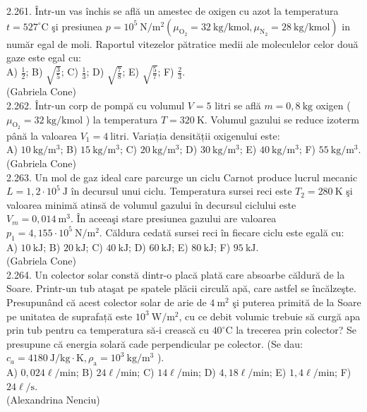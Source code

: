 \documentclass[10pt]{article}
\begin{document}
2.261. Într-un vas închis se află un amestec de oxigen cu azot la temperatura $t=527^{\circ} \mathrm{C}$ şi presiunea $p=10^{5} \mathrm{~N} / \mathrm{m}^{2}\left(\mu_{\mathrm{O}_{2}}=32 \mathrm{~kg} / \mathrm{kmol}, \mu_{\mathrm{N}_{2}}=28 \mathrm{~kg} / \mathrm{kmol}\right)$ in număr egal de moli. Raportul vitezelor pătratice medii ale moleculelor celor două gaze este egal cu:\\ A) $\frac{1}{2}$; B) $\sqrt{\frac{3}{5}}$; C) $\frac{1}{3}$; D) $\sqrt{\frac{7}{8}}$; E) $\sqrt{\frac{5}{7}}$; F) $\frac{2}{3}$.\\ (Gabriela Cone)\\

2.262. Într-un corp de pompă cu volumul $V=5$ litri se află $m=0,8 \mathrm{~kg}$ oxigen ( $\mu_{\mathrm{O}_{2}}=32 \mathrm{~kg} / \mathrm{kmol}$ ) la temperatura $T=320 \mathrm{~K}$. Volumul gazului se reduce izoterm până la valoarea $V_{1}=4 \mathrm{~litri}$. Variația densității oxigenului este:\\ A) $10 \mathrm{~kg} / \mathrm{m}^{3}$; B) $15 \mathrm{~kg} / \mathrm{m}^{3}$; C) $20 \mathrm{~kg} / \mathrm{m}^{3}$; D) $30 \mathrm{~kg} / \mathrm{m}^{3}$; E) $40 \mathrm{~kg} / \mathrm{m}^{3}$; F) $55 \mathrm{~kg} / \mathrm{m}^{3}$.\\ (Gabriela Cone)\\

2.263. Un mol de gaz ideal care parcurge un ciclu Carnot produce lucrul mecanic $L=1,2 \cdot 10^{5} \mathrm{~J}$ în decursul unui ciclu. Temperatura sursei reci este $T_{2}=280 \mathrm{~K}$ şi valoarea minimă atinsă de volumul gazului în decursul ciclului este $V_{m}=0,014 \mathrm{~m}^{3}$. În aceeaşi stare presiunea gazului are valoarea $p_{1}=4,155 \cdot 10^{5} \mathrm{~N} / \mathrm{m}^{2}$. Căldura cedată sursei reci în fiecare ciclu este egală cu:\\ A) $10 \mathrm{~kJ}$; B) $20 \mathrm{~kJ}$; C) $40 \mathrm{~kJ}$; D) $60 \mathrm{~kJ}$; E) $80 \mathrm{~kJ}$; F) $95 \mathrm{~kJ}$.\\ (Gabriela Cone)\\

2.264. Un colector solar constă dintr-o placă plată care absoarbe căldură de la Soare. Printr-un tub ataşat pe spatele plăcii circulǎ apă, care astfel se încălzeşte. Presupunând că acest colector solar de arie de $4 \mathrm{~m}^{2}$ şi puterea primită de la Soare pe unitatea de suprafață este $10^{3} \mathrm{~W} / \mathrm{m}^{2}$, cu ce debit volumic trebuie să curgă apa prin tub pentru ca temperatura să-i crească cu $40^{\circ} \mathrm{C}$ la trecerea prin colector? Se presupune că energia solară cade perpendicular pe colector. (Se dau: $c_{a}=4180 \mathrm{~J} / \mathrm{kg} \cdot \mathrm{K}, \rho_{\mathrm{a}}=10^{3} \mathrm{~kg} / \mathrm{m}^{3}$ ).\\ A) $0,024 \ell / \mathrm{min}$; B) $24 \ell / \mathrm{min}$; C) $14 \ell / \mathrm{min}$; D) $4,18 \ell / \mathrm{min}$; E) $1,4 \ell / \mathrm{min}$; F) $24 \ell / \mathrm{s}$.\\ (Alexandrina Nenciu)\\
\end{document}

